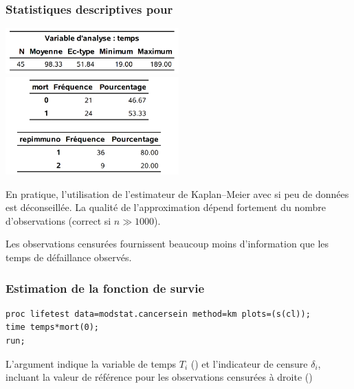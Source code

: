 \documentclass{beamer}
\begin{document}
\begin{frame}
\frametitle{Statistiques descriptives pour }
\begin{center}
\includegraphics[width = 0.5\textwidth]{img/c7/diapos7e01}
\includegraphics[width = 0.5\textwidth]{img/c7/diapos7e02}
\end{center}
{
\footnotesize En pratique, l'utilisation de l'estimateur de Kaplan--Meier avec si peu de données est déconseillée. La qualité de l'approximation dépend fortement du nombre d'observations (correct si $n \gg 1000$).

Les observations censurées fournissent beaucoup moins d'information que les temps de défaillance observés.

}
\end{frame}


\begin{frame}[fragile]
\frametitle{Estimation de la fonction de survie }

\begin{tcolorbox}[colback=white,colframe=hecblue,title=Code \SASlang{} pour ajuster l'estimateur de Kaplan--Meier]
{\footnotesize 
\begin{verbatim}
proc lifetest data=modstat.cancersein method=km plots=(s(cl));
time temps*mort(0);
run;
\end{verbatim}
}
\end{tcolorbox}
{ \footnotesize 
L'argument  indique la variable de temps $T_i$ () et l'indicateur de censure $\delta_i$,  incluant la valeur de référence pour les observations censurées à droite ()

}
\end{frame}
\end{document}
